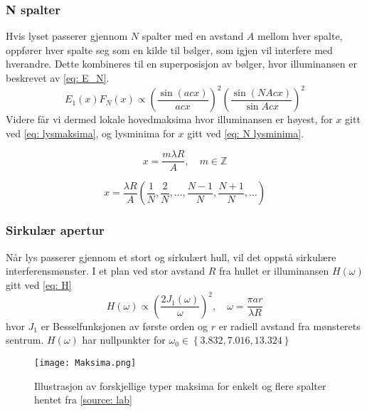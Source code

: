 \documentclass[reprint,norsk,notitlepage,floatfix]{revtex4-2}
\begin{document}
    \subsubsection*{N spalter}
    Hvis lyset passerer gjennom $N$ spalter med en avstand $A$ mellom hver spalte, oppfører hver spalte seg som en kilde til bølger, som igjen vil interfere med hverandre. Dette kombineres til en superposisjon av bølger, hvor illuminansen er beskrevet av \cref{eq: E_N}. 
    \begin{equation}\label{eq: E_N}
      E_1(x) F_N(x) \propto \left(\frac{\sin (acx)}{acx}\right)^2 \left(\frac{\sin (NAcx)}{\sin Acx}\right)^2
    \end{equation}
    Videre får vi dermed lokale hovedmaksima hvor illuminansen er høyest, for $x$ gitt ved \cref{eq: lysmaksima}, og lysminima for $x$ gitt ved \cref{eq: N lysminima}.
     
    \begin{equation}\label{eq: lysmaksima}
      x = \frac{mλR}{A}, \quad m ∈ ℤ
    \end{equation}
    
    \begin{equation}\label{eq: N lysminima}
      x = \frac{λR}{A} \left(\frac{1}{N}, \frac{2}{N},\ldots , \frac{N-1}{N}, \frac{N+1}{N},\ldots  \right)
    \end{equation}
    \subsubsection*{Sirkulær apertur}
      Når lys passerer gjennom et stort og sirkulært hull, vil det oppstå sirkulære interferensmønster. I et plan ved stor avstand $R$ fra hullet er illuminansen $H(ω)$ gitt ved \cref{eq: H}
      \begin{equation}\label{eq: H}
        H(ω) \propto \left(\frac{2J_1(ω)}{ω}\right)^2 , \quad ω = \frac{πar}{λR}
      \end{equation}
      hvor $J_1$ er Besselfunksjonen av første orden og $r$ er radiell avstand fra mønsterets sentrum. $H(ω)$ har nullpunkter for $ω_0 ∈ \left\{3.832, 7.016, 13.324\right\}$ 
      
      \begin{figure}[h!]
        \centering
        \texttt{[image: Maksima.png]}
        \caption{Illustrasjon av forskjellige typer maksima for enkelt og flere spalter hentet fra \ref{source: lab}}
        \label{fig: maksima}
      \end{figure}
    
\end{document}
